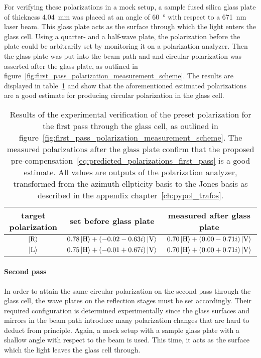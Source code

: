 For verifying these polarizations in a mock setup, a sample fused silica glass plate of thickness \SI{4.04}{\milli\meter} was placed at an angle of \SI{60}{\degree} with respect to a \SI{671}{\nano\meter} laser beam. This glass plate acts as the surface through which the light enters the glass cell. Using a quarter- and a half-wave plate, the polarization before the plate could be arbitrarily set by monitoring it on a polarization analyzer. Then the glass plate was put into the beam path and and circular polarization was asserted after the glass plate, as outlined in figure~\ref{fig:first_pass_polarization_measurement_scheme}. The results are displayed in table~\ref{tab:polarization_first_pass} and show that the aforementioned estimated polarizations  are a good estimate for producing circular polarization in the glass cell.

\begin{table}
    \centering

    \begin{tabular}{ccc}
        \toprule
        \textbf{target polarization} & \textbf{set before glass plate} & \textbf{measured after glass plate} \\
        \toprule
        $\Ket{\text{R}}$ & $0.78 \Ket{\text{H}} + (-0.02-0.63i) \Ket{\text{V}}$ & $0.70 \Ket{\text{H}} +(0.00-0.71i)\Ket{\text{V}}$ \\
        $\Ket{\text{L}}$ & $0.75 \Ket{\text{H}} + (-0.01+0.67i)\Ket{\text{V}}$ & $0.70 \Ket{\text{H}} + (0.00+0.71i)\Ket{\text{V}}$ \\
        \bottomrule
    \end{tabular}
    \caption{Results of the experimental verification of the preset polarization for the first pass through the glass cell, as outlined in figure~\ref{fig:first_pass_polarization_measurement_scheme}. The measured polarizations after the glass plate confirm that the proposed pre-compensation~\eqref{eq:predicted_polarizations_first_pass} is a good estimate. All values are outputs of the polarization analyzer, transformed from the azimuth-ellpticity basis to the Jones basis as described in the appendix chapter~\ref{ch:pypol_trafos}.}
        \label{tab:polarization_first_pass}
\end{table}

\paragraph{Second pass}
In order to attain the same circular polarization on the second pass through the glass cell, the wave plates on the reflection stages must be set accordingly. Their required configuration is determined experimentally since the glass surfaces and mirrors in the beam path introduce many polarization changes that are hard to deduct from principle. Again, a mock setup with a sample glass plate with a shallow angle with respect to the beam is used. This time, it acts as the surface which the light leaves the glass cell through.

